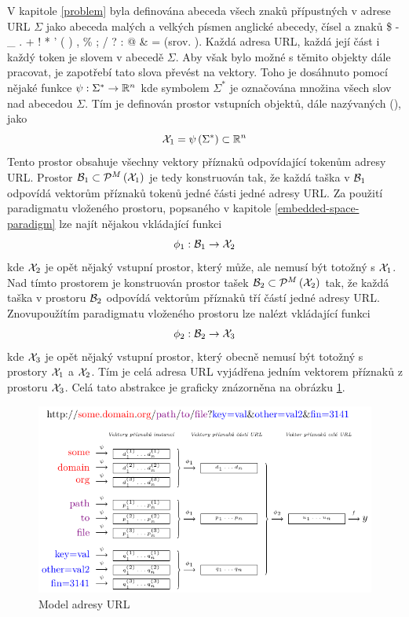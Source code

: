 V kapitole \ref{problem} byla definována abeceda všech znaků přípustných v adrese URL \( \Sigma \) jako abeceda malých a velkých písmen anglické abecedy, čísel a znaků \$ - \_ . + ! * ' ( ) , \% ; / ? : @ \& = (srov. \cite{berners-lee_uniform_1994}). Každá adresa URL, každá její část i každý token je slovem v abecedě \( \Sigma \). Aby však bylo možné s těmito objekty dále pracovat, je zapotřebí tato slova převést na vektory. Toho je dosáhnuto pomocí nějaké funkce \( \psi : \Sigma^* \to \mathbb R^n \) kde symbolem \( \Sigma^* \) je označována množina všech slov nad abecedou \( \Sigma \). Tím je definován prostor vstupních objektů, dále nazývaných  (), jako
\[ \mathcal X_1 = \psi \left( \Sigma^* \right) \subset \mathbb R^n \]
Tento prostor obsahuje všechny vektory příznaků odpovídající tokenům adresy URL. Prostor \( \mathcal B_1 \subset \mathcal P^M \left( \mathcal X_1 \right) \) je tedy konstruován tak, že každá taška v \( \mathcal B_1 \) odpovídá vektorům příznaků tokenů jedné části jedné adresy URL. Za použití paradigmatu vloženého prostoru, popsaného v kapitole \ref{embedded-space-paradigm} lze najít nějakou vkládající funkci
\[ \phi_1 : \mathcal B_1 \to \mathcal X_2 \]
kde \( \mathcal X_2 \) je opět nějaký vstupní prostor, který může, ale nemusí být totožný s \( \mathcal X_1 \). Nad tímto prostorem je konstruován prostor tašek \( \mathcal B_2 \subset \mathcal P^M \left( \mathcal X_2 \right) \) tak, že každá taška v prostoru \( \mathcal B_2 \) odpovídá vektorům příznaků tří částí jedné adresy URL. Znovupoužítím paradigmatu vloženého prostoru lze nalézt vkládající funkci
\[ \phi_2 : \mathcal B_2 \to \mathcal X_3 \]
kde \( \mathcal X_3 \) je opět nějaký vstupní prostor, který obecně nemusí být totožný s prostory \( \mathcal X_1 \) a \( \mathcal X_2 \). Tím je celá adresa URL vyjádřena jedním vektorem příznaků z prostoru \( \mathcal X_3 \). Celá tato abstrakce je graficky znázorněna na obrázku \ref{url_model_MIL}.

\begin{figure}[h]
	\centering
	\includegraphics{images/model_MIL/model_MIL.pdf}
	\caption{Model adresy URL}\label{url_model_MIL}
\end{figure}

